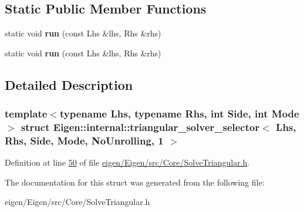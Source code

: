 \subsection*{Static Public Member Functions}
\begin{DoxyCompactItemize}
\item 
\mbox{\label{struct_eigen_1_1internal_1_1triangular__solver__selector_3_01_lhs_00_01_rhs_00_01_side_00_01_modf7016aec58372d55e43776676d69f5fb_ace16c68927cde184c0d5703c58f3780a}} 
static void {\bfseries run} (const Lhs \&lhs, Rhs \&rhs)
\item 
\mbox{\label{struct_eigen_1_1internal_1_1triangular__solver__selector_3_01_lhs_00_01_rhs_00_01_side_00_01_modf7016aec58372d55e43776676d69f5fb_ace16c68927cde184c0d5703c58f3780a}} 
static void {\bfseries run} (const Lhs \&lhs, Rhs \&rhs)
\end{DoxyCompactItemize}


\subsection{Detailed Description}
\subsubsection*{template$<$typename Lhs, typename Rhs, int Side, int Mode$>$\newline
struct Eigen\+::internal\+::triangular\+\_\+solver\+\_\+selector$<$ Lhs, Rhs, Side, Mode, No\+Unrolling, 1 $>$}



Definition at line \hyperlink{eigen_2_eigen_2src_2_core_2_solve_triangular_8h_source_l00050}{50} of file \hyperlink{eigen_2_eigen_2src_2_core_2_solve_triangular_8h_source}{eigen/\+Eigen/src/\+Core/\+Solve\+Triangular.\+h}.



The documentation for this struct was generated from the following file\+:\begin{DoxyCompactItemize}
\item 
eigen/\+Eigen/src/\+Core/\+Solve\+Triangular.\+h\end{DoxyCompactItemize}
